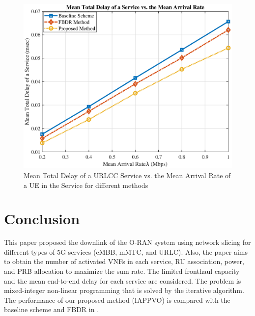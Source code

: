 \documentclass[conference]{IEEEtran}
\begin{document}
\begin{figure}
  \centering 
    \includegraphics[scale = 0.5]{delay1_new.eps}
  \caption{Mean Total Delay of a URLCC Service vs. the Mean Arrival Rate of a UE in the Service for different methods}
  \label{fig:7}
\end{figure}
\section{Conclusion}\label{conc}
This paper proposed the downlink of the O-RAN system using network slicing for different types of 5G services (eMBB, mMTC, and URLC). Also, the paper aims to obtain the number of activated VNFs in each service, RU association, power, and PRB allocation to maximize the sum rate. The limited fronthaul capacity and the mean end-to-end delay for each service are considered.  The problem is mixed-integer non-linear programming that is solved by the iterative algorithm. The performance of our proposed method (IAPPVO) is compared with the baseline scheme and FBDR in \cite{lee2018dynamic}.  

\end{document}
